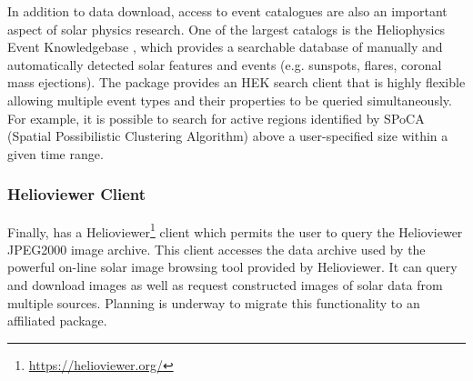 In addition to data download, access to event catalogues are also an important aspect of solar physics research.
One of the largest catalogs is the Heliophysics Event Knowledgebase \citep[HEK,][]{hek}, which provides a searchable database of manually and automatically detected solar features and events (e.g. sunspots, flares, coronal mass ejections). The \sunpypkg package provides an HEK search client that is highly flexible allowing multiple event types and their properties to be queried simultaneously.
For example, it is possible to search for active regions identified by SPoCA (Spatial Possibilistic Clustering Algorithm) \citep{2014AA...561A..29V} above a user-specified size within a given time range.

\subsubsection{Helioviewer Client}
\label{sec:helioviewer}

Finally,  has a Helioviewer\footnote{\url{https://helioviewer.org/}} client which permits the user to query the Helioviewer JPEG2000 image archive.
This client accesses the data archive used by the powerful on-line solar image browsing tool provided by Helioviewer.
It can query and download images as well as request constructed images of solar data from multiple sources.
Planning is underway to migrate this functionality to an affiliated package.
